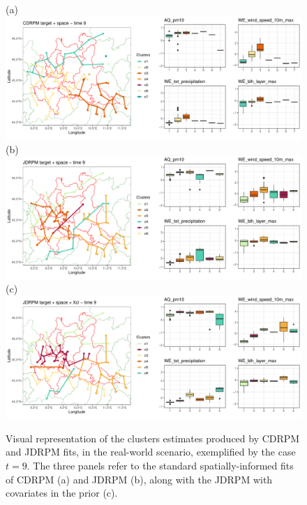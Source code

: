\documentclass[12pt,	%
	a4paper,		%
	twoside,		%
	openright,		%
	titlepage,%
	]{book}
\theoremstyle{definition}
\begin{document}
\begin{figure}[!ht]
    \centering
    \footnotesize{(a)}\includegraphics[width=1\linewidth]{Testing/Covariates/in clustering/space C/CDRPM target + space_t09.pdf}
    \footnotesize{(b)}\includegraphics[width=1\linewidth]{Testing/Covariates/in clustering/space J/JDRPM target + space_t09.pdf}
    \footnotesize{(c)}\includegraphics[width=1\linewidth]{Testing/Covariates/in clustering/space J Xcl/JDRPM target + space + Xcl_t09.pdf}
    \caption[Visual representation of the clusters estimates of CDRPM and JDRPM, real-world scenario, covariates in the prior, selected example]{Visual representation of the clusters estimates produced by CDRPM and JDRPM fits, in the real-world scenario, exemplified by the case $t=9$. The three panels refer to the standard spatially-informed fits of CDRPM (a) and JDRPM (b), along with the JDRPM with covariates in the prior (c).}
    \label{fig: summary fits battle}
\end{figure}
\end{document}

